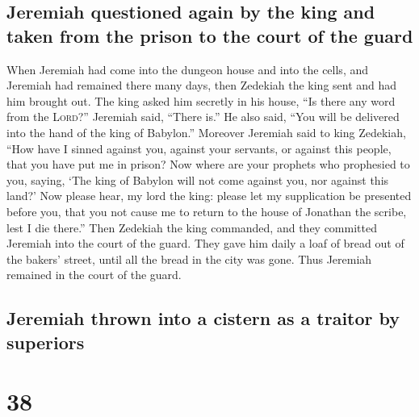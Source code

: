 \hypertarget{jeremiah-questioned-again-by-the-king-and-taken-from-the-prison-to-the-court-of-the-guard}{%
\subsection{Jeremiah questioned again by the king and taken from the
prison to the court of the
guard}\label{jeremiah-questioned-again-by-the-king-and-taken-from-the-prison-to-the-court-of-the-guard}}

 When Jeremiah had come into the dungeon house and into
the cells, and Jeremiah had remained there many days, 
then Zedekiah the king sent and had him brought out. The king asked him
secretly in his house, ``Is there any word from the \textsc{Lord}?''
Jeremiah said, ``There is.'' He also said, ``You will be delivered into
the hand of the king of Babylon.''  Moreover Jeremiah
said to king Zedekiah, ``How have I sinned against you, against your
servants, or against this people, that you have put me in prison?
 Now where are your prophets who prophesied to you,
saying, `The king of Babylon will not come against you, nor against this
land?'  Now please hear, my lord the king: please let my
supplication be presented before you, that you not cause me to return to
the house of Jonathan the scribe, lest I die there.'' 
Then Zedekiah the king commanded, and they committed Jeremiah into the
court of the guard. They gave him daily a loaf of bread out of the
bakers' street, until all the bread in the city was gone. Thus Jeremiah
remained in the court of the guard.

\hypertarget{jeremiah-thrown-into-a-cistern-as-a-traitor-by-superiors}{%
\subsection{Jeremiah thrown into a cistern as a traitor by
superiors}\label{jeremiah-thrown-into-a-cistern-as-a-traitor-by-superiors}}

\hypertarget{section-37}{%
\section{38}\label{section-37}}

